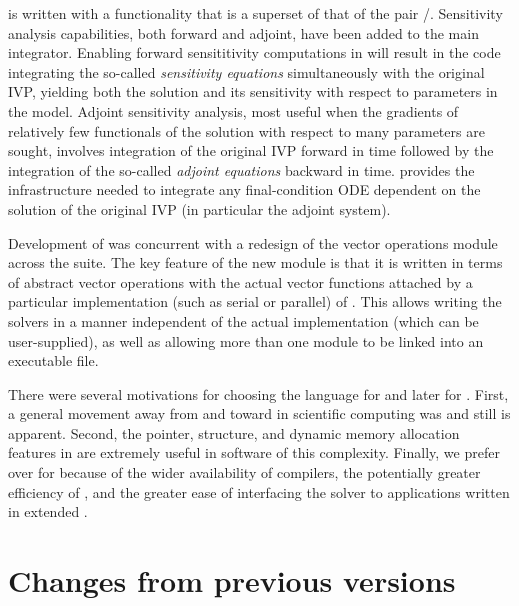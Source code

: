 {\cvodes} is written with a functionality that is a superset of that of the pair
{\cvode}/{\pvode}. Sensitivity analysis capabilities, both forward and adjoint, 
have been added to the main integrator. Enabling forward sensititivity computations 
in {\cvodes} will result in the code integrating the so-called {\em sensitivity equations}
simultaneously with the original IVP, yielding both the solution and its sensitivity
with respect to parameters in the model. Adjoint sensitivity analysis, most useful
when the gradients of relatively few functionals of the solution with respect to
many parameters are sought, involves integration of the original IVP forward in time
followed by the integration of the so-called {\em adjoint equations} backward
in time. {\cvodes} provides the infrastructure needed to integrate any final-condition ODE
dependent on the solution of the original IVP (in particular the adjoint system). 

Development of {\cvodes} was concurrent with a redesign of the vector operations module
across the {\sundials} suite. The key feature of the new {\nvector} module is that it
is written in terms of abstract vector operations with the actual vector functions attached
by a particular implementation (such as serial or parallel) of {\nvector}. This allows
writing the {\sundials} solvers in a manner independent of the actual {\nvector} 
implementation (which can be user-supplied), as well as allowing more than one 
{\nvector} module to be linked into an executable file.

There were several motivations for choosing the {\C} language for {\cvode} and later
for {\cvodes}.
First, a general movement away from {\F} and toward {\C} in scientific
computing was and still is apparent.  Second, the pointer, structure, and dynamic
memory allocation features in {\C} are extremely useful in software of
this complexity.
Finally, we prefer {\C} over {\CPP} for {\cvodes} because of the wider
availability of {\C} compilers, the potentially greater efficiency of {\C},
and the greater ease of interfacing the solver to applications written
in extended {\F}.

\section{Changes from previous versions}

